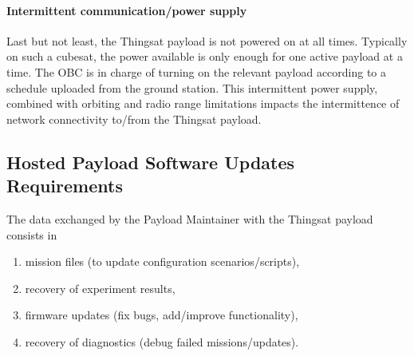 \paragraph*{Intermittent communication/power supply}
Last but not least, the Thingsat payload is not powered on at all times.
Typically on such a cubesat, the power available is only
enough for one active payload at a time. 
The OBC is in charge of turning on the relevant payload according to a schedule uploaded from the ground station. 
This intermittent power supply, combined with orbiting and radio range limitations impacts the intermittence of network connectivity to/from the Thingsat payload.

\subsection{Hosted Payload Software Updates Requirements}
\label{sec:thingsat-update-req}


The data exchanged by the Payload Maintainer with the Thingsat payload consists in 
\begin{enumerate}
    \item mission files (to update configuration scenarios/scripts),
    \item recovery of experiment results,
    \item firmware updates (fix bugs, add/improve functionality),
    \item recovery of diagnostics (debug failed missions/updates).
\end{enumerate} 


